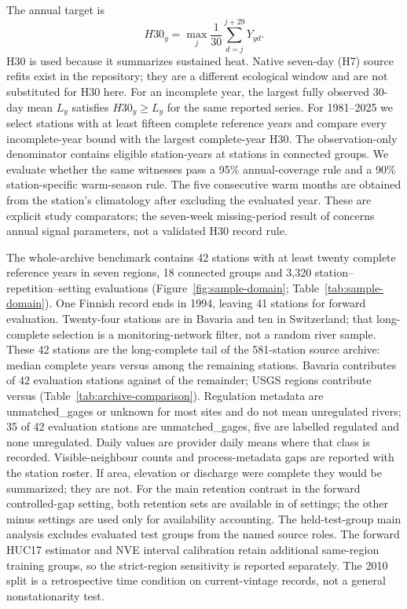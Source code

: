 \documentclass[draft,linenumbers]{agujournal2025}
\begin{document}
The annual target is
\begin{equation}
 H30_y=\max_{j}\frac{1}{30}\sum_{d=j}^{j+29}Y_{yd}.
\end{equation}
H30 is used because it summarizes sustained heat. Native seven-day (H7) source refits exist in the repository; they are a different ecological window and are not substituted for H30 here. For an incomplete year, the largest fully observed 30-day mean $L_y$ satisfies $H30_y\ge L_y$ for the same reported series. For 1981--2025 we select stations with at least fifteen complete reference years and compare every incomplete-year bound with the largest complete-year H30. The observation-only denominator contains \CCEligibleYears{} eligible station-years at \CCEligibleStations{} stations in \CCEligibleGroups{} connected groups. We evaluate whether the same witnesses pass a 95\% annual-coverage rule and a 90\% station-specific warm-season rule. The five consecutive warm months are obtained from the station's climatology after excluding the evaluated year. These are explicit study comparators; the seven-week missing-period result of  concerns annual signal parameters, not a validated H30 record rule.

The whole-archive benchmark contains 42 stations with at least twenty complete reference years in seven regions, 18 connected groups and 3,320 station--repetition--setting evaluations (Figure~\ref{fig:sample-domain}; Table~\ref{tab:sample-domain}). One Finnish record ends in 1994, leaving 41 stations for forward evaluation. Twenty-four stations are in Bavaria and ten in Switzerland; that long-complete selection is a monitoring-network filter, not a random river sample. These 42 stations are the long-complete tail of the 581-station source archive: median complete years \PRArchiveTrendComplete{} versus \PRArchiveRestComplete{} among the remaining \PRArchiveRestN{} stations. Bavaria contributes \PRArchiveTrendBavaria{} of 42 evaluation stations against \PRArchiveRestBavaria{} of the remainder; USGS regions contribute \PRArchiveTrendUsgs{} versus \PRArchiveRestUsgs{} (Table~\ref{tab:archive-comparison}). Regulation metadata are unmatched\_gages or unknown for most sites and do not mean unregulated rivers; 35 of 42 evaluation stations are unmatched\_gages, five are labelled regulated and none unregulated. Daily values are provider daily means where that class is recorded. Visible-neighbour counts and process-metadata gaps are reported with the station roster. If area, elevation or discharge were complete they would be summarized; they are not. For the main retention contrast in the forward controlled-gap setting, both retention sets are available in \CCCohortCommon{} of \CCCohortAll{} settings; the other \CCCohortAll{} minus \CCCohortCommon{} settings are used only for availability accounting. The held-test-group main analysis excludes evaluated test groups from the named source roles. The forward HUC17 estimator and NVE interval calibration retain additional same-region training groups, so the strict-region sensitivity is reported separately. The 2010 split is a retrospective time condition on current-vintage records, not a general nonstationarity test.
\end{document}

